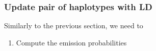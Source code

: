 \documentclass{bioinfo}
\begin{document}
\begin{methods}
\begin{enumerate}

\end{enumerate}


\subsubsection{Update pair of haplotypes with LD}\label{sec:deconvolute}
Similarly to the previous section, we need to
\begin{enumerate}
\item Compute the emission probabilities


\end{enumerate}
\end{methods}
\end{document}
